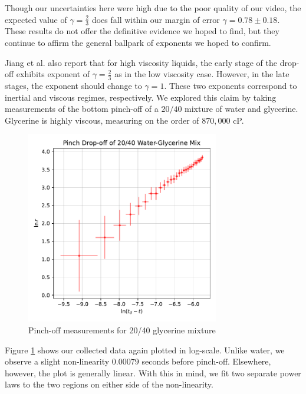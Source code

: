 \documentclass[12pt, letterpaper]{article}
\begin{document}
Though our uncertainties here were high due to the poor quality of our video, the expected value of $\gamma = \frac{2}{3}$ does fall within our margin of error $\gamma = 0.78 \pm 0.18$. These results do not offer the definitive evidence we hoped to find, but they continue to affirm the general ballpark of exponents we hoped to confirm. 

Jiang et al. also report that for high viscosity liquids, the early stage of the drop-off exhibits exponent of $\gamma = \frac{2}{3}$ as in the low viscosity case. However, in the late stages, the exponent should change to $\gamma = 1$. These two exponents correspond to inertial and viscous regimes, respectively. We explored this claim by taking measurements of the bottom pinch-off of a $20/40$ mixture of water and glycerine. Glycerine is highly viscous, measuring on the order of $870,000$ cP. 

\begin{figure}[!h]
    \centering
    \includegraphics[width=0.75\textwidth]{experiment3/figures/plots/5glyce.pdf}
    \caption{Pinch-off measurements for 20/40 glycerine mixture}
    \label{fig:glycerine}
\end{figure}

Figure \ref{fig:glycerine} shows our collected data again plotted in log-scale. Unlike water, we observe a slight non-linearity $0.00079$ seconds before pinch-off. Elsewhere, however, the plot is generally linear. With this in mind, we fit two separate power laws to the two regions on either side of the non-linearity. 
\end{document}

